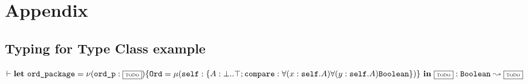 \appendix

\section{Appendix}

\subsection{Typing for Type Class example}

$\TJ{}{\LET{\texttt{ord\_package}}{\OBJ{\texttt{ord\_p}}{\TODOTHIS}{
    \{\texttt{Ord} = \REC{\texttt{self}}{\{A: \bot..\top; \texttt{compare}:
    \DFUN{x}{\texttt{self}.A}{\DFUN{y}{\texttt{self}.A}{\texttt{Boolean}}}
    \}}\}} \\
}{\TODOTHIS}}{\texttt{Boolean}}{\TODOTHIS}$
